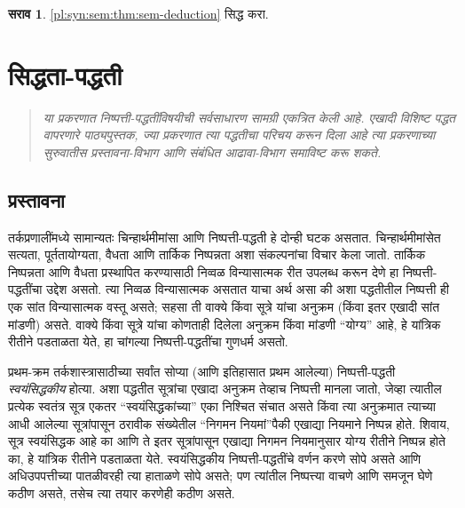 \documentclass[11pt,a4paper,openany]{book}
\theoremstyle{definition}
\newtheorem{prob}{सराव}[chapter]
\newenvironment{editorial}{\begin{quote}\small\itshape}{\end{quote}}
\begin{document}
\begin{prob}
\ref{pl:syn:sem:thm:sem-deduction} सिद्ध करा.
\end{prob}



\chapter{सिद्धता-पद्धती}\label{fol:prf::chap}
\begin{editorial}
या प्रकरणात निष्पत्ती-पद्धतींविषयीची सर्वसाधारण सामग्री
एकत्रित केली आहे. एखादी विशिष्ट पद्धत वापरणारे पाठ्यपुस्तक,
ज्या प्रकरणात त्या पद्धतीचा परिचय करून दिला आहे त्या प्रकरणाच्या
सुरुवातीस प्रस्तावना-विभाग आणि संबंधित आढावा-विभाग समाविष्ट करू शकते.
\end{editorial}






\section{प्रस्तावना}\label{fol:prf:int:sec}

तर्कप्रणालींमध्ये सामान्यतः चिन्हार्थमीमांसा आणि निष्पत्ती-पद्धती हे दोन्ही घटक असतात. चिन्हार्थमीमांसेत सत्यता, पूर्ततायोग्यता,
वैधता आणि तार्किक निष्पन्नता अशा संकल्पनांचा विचार केला जातो.
तार्किक निष्पन्नता आणि वैधता प्रस्थापित करण्यासाठी निव्वळ विन्यासात्मक
रीत उपलब्ध करून देणे हा निष्पत्ती-पद्धतींचा उद्देश असतो. त्या
निव्वळ विन्यासात्मक असतात याचा अर्थ असा की अशा पद्धतीतील
निष्पत्ती ही एक सांत विन्यासात्मक वस्तू असते; सहसा ती
वाक्ये किंवा सूत्रे यांचा अनुक्रम (किंवा इतर एखादी सांत
मांडणी) असते. वाक्ये किंवा सूत्रे यांचा कोणताही दिलेला
अनुक्रम किंवा मांडणी ``योग्य'' आहे, हे यांत्रिक रीतीने पडताळता येते,
हा चांगल्या निष्पत्ती-पद्धतींचा गुणधर्म असतो.

प्रथम-क्रम तर्कशास्त्रासाठीच्या सर्वांत सोप्या (आणि इतिहासात प्रथम
आलेल्या) निष्पत्ती-पद्धती \emph{स्वयंसिद्धकीय} होत्या. अशा
पद्धतीत सूत्रांचा एखादा अनुक्रम तेव्हाच निष्पत्ती मानला
जातो, जेव्हा त्यातील प्रत्येक स्वतंत्र सूत्र एकतर
``स्वयंसिद्धकांच्या'' एका निश्चित संचात असते किंवा त्या अनुक्रमात
त्याच्या आधी आलेल्या सूत्रांपासून ठरावीक संख्येतील ``निगमन
नियमां''पैकी एखाद्या नियमाने निष्पन्न होते. शिवाय, सूत्र
स्वयंसिद्धक आहे का आणि ते इतर सूत्रांपासून एखाद्या निगमन
नियमानुसार योग्य रीतीने निष्पन्न होते का, हे यांत्रिक रीतीने पडताळता
येते. स्वयंसिद्धकीय निष्पत्ती-पद्धतींचे वर्णन करणे सोपे असते आणि
अधिउपपत्तीच्या पातळीवरही त्या हाताळणे सोपे असते; पण त्यांतील
निष्पत्त्या वाचणे आणि समजून घेणे कठीण असते, तसेच त्या तयार करणेही
कठीण असते.
\end{document}
